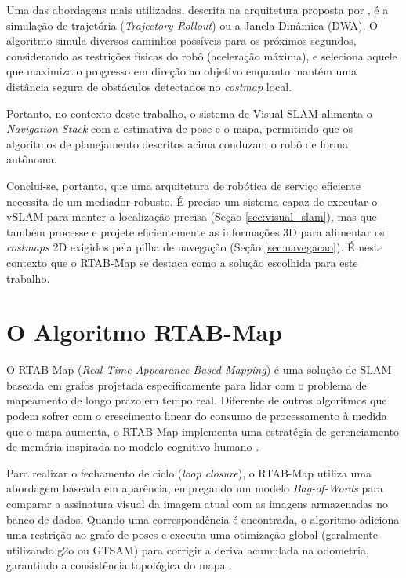 Uma das abordagens mais utilizadas, descrita na arquitetura proposta por , é a simulação de trajetória (\textit{Trajectory Rollout}) ou a Janela Dinâmica (DWA). O algoritmo simula diversos caminhos possíveis para os próximos segundos, considerando as restrições físicas do robô (aceleração máxima), e seleciona aquele que maximiza o progresso em direção ao objetivo enquanto mantém uma distância segura de obstáculos detectados no \textit{costmap} local.

Portanto, no contexto deste trabalho, o sistema de Visual SLAM alimenta o \textit{Navigation Stack} com a estimativa de pose e o mapa, permitindo que os algoritmos de planejamento descritos acima conduzam o robô de forma autônoma.

Conclui-se, portanto, que uma arquitetura de robótica de serviço eficiente necessita de um mediador robusto. É preciso um sistema capaz de executar o vSLAM para manter a localização precisa (Seção \ref{sec:visual_slam}), mas que também processe e projete eficientemente as informações 3D para alimentar os \textit{costmaps} 2D exigidos pela pilha de navegação (Seção \ref{sec:navegacao}). É neste contexto que o RTAB-Map se destaca como a solução escolhida para este trabalho.

\section{O Algoritmo RTAB-Map}
\label{sec:rtab_map}

O RTAB-Map (\textit{Real-Time Appearance-Based Mapping}) é uma solução de SLAM baseada em grafos projetada especificamente para lidar com o problema de mapeamento de longo prazo em tempo real. Diferente de outros algoritmos que podem sofrer com o crescimento linear do consumo de processamento à medida que o mapa aumenta, o RTAB-Map implementa uma estratégia de gerenciamento de memória inspirada no modelo cognitivo humano \cite{labbé2019rtabmapopensourcelidar}.

Para realizar o fechamento de ciclo (\textit{loop closure}), o RTAB-Map utiliza uma abordagem baseada em aparência, empregando um modelo \textit{Bag-of-Words} para comparar a assinatura visual da imagem atual com as imagens armazenadas no banco de dados. Quando uma correspondência é encontrada, o algoritmo adiciona uma restrição ao grafo de poses e executa uma otimização global (geralmente utilizando g2o ou GTSAM) para corrigir a deriva acumulada na odometria, garantindo a consistência topológica do mapa \cite{labbé2019rtabmapopensourcelidar}.

